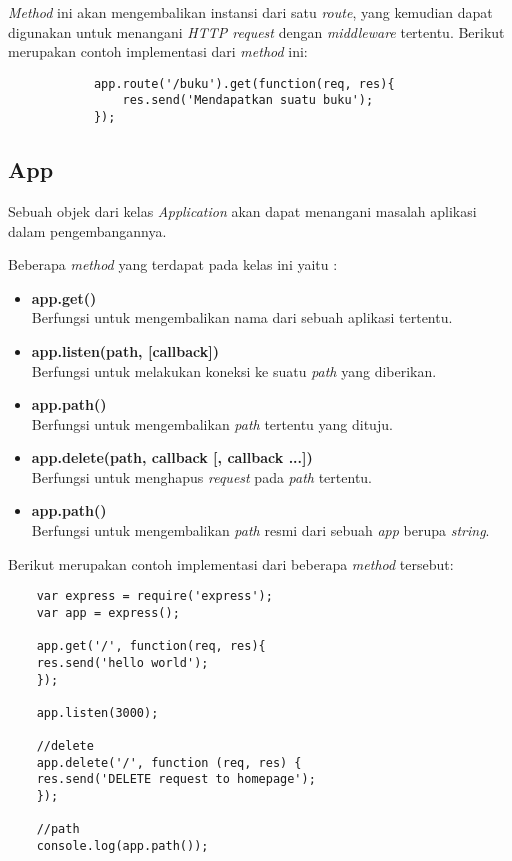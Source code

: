 \begin{itemize}
		\textit{Method} ini akan mengembalikan instansi dari satu \textit{route}, yang kemudian dapat digunakan untuk menangani \textit{HTTP request} dengan \textit{middleware} tertentu. Berikut merupakan contoh implementasi dari \textit{method} ini:
		\begin{lstlisting}
			app.route('/buku').get(function(req, res){
				res.send('Mendapatkan suatu buku');
			});
		\end{lstlisting}
		
\end{itemize}

\subsection{App}
Sebuah objek dari kelas \textit{Application} akan dapat menangani masalah aplikasi dalam pengembangannya. 

Beberapa \textit{method} yang terdapat pada kelas ini yaitu : 
\begin{itemize}
	\item \textbf{app.get()} \\ Berfungsi untuk mengembalikan nama dari sebuah aplikasi tertentu.
	
	\item \textbf{app.listen(path, [callback])} \\ Berfungsi untuk melakukan koneksi ke suatu \textit{path} yang diberikan.
	
	\item \textbf{app.path()} \\ Berfungsi untuk mengembalikan \textit{path} tertentu yang dituju.
	
	\item \textbf{app.delete(path, callback [, callback ...])} \\ Berfungsi untuk menghapus \textit{request} pada \textit{path} tertentu.
	
	\item \textbf{app.path()} \\ Berfungsi untuk mengembalikan \textit{path} resmi dari sebuah \textit{app} berupa \textit{string}.
	
	
\end{itemize}

Berikut merupakan contoh implementasi dari beberapa \textit{method} tersebut:

\begin{lstlisting}
	var express = require('express');
	var app = express();
	
	app.get('/', function(req, res){
	res.send('hello world');
	});
	
	app.listen(3000);
	
	//delete
	app.delete('/', function (req, res) {
	res.send('DELETE request to homepage');
	});
	
	//path
	console.log(app.path());
	
\end{lstlisting}

